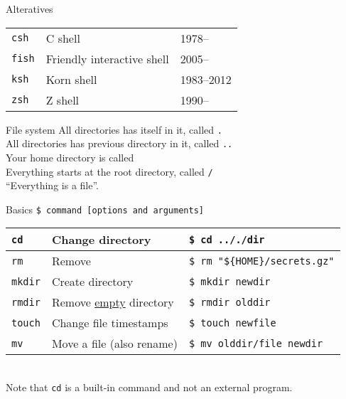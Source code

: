 \documentclass{beamer}
\let\tt\texttt
\let\ul\underline
\begin{document}
\begin{frame}{Alteratives}
        \begin{tabular}{p{} p{} p{}}
                \tt{csh}        & C shell   & 1978--  \\
                \tt{fish}       & Friendly interactive shell &  2005-- \\
                \tt{ksh}        & Korn shell & 1983--2012 \\
                \tt{zsh}        & Z shell & 1990--  \\
        \end{tabular}
\end{frame}

\begin{frame}{File system}
        All directories has itself in it, called \tt{.}                \\
        All directories has previous directory in it, called \tt{..}   \\
        Your home directory is called \tt{~}                           \\
        Everything starts at the root directory, called \tt{/}         \\
        ``Everything is a file''.
\end{frame}

\begin{frame}{Basics}
        \tt{\$ command [options and arguments]}  \\
        \begin{tabular}{p{} p{} p{}}
                \hline
                \tt{cd}           &
                Change directory  &
                \tt{\$ cd .././dir}  \\
                \hline
                \tt{rm}           &
                Remove &
                \tt{\$ rm "\$\{HOME\}/secrets.gz"}  \\
                \hline
                \tt{mkdir}           &
                Create directory &
                \tt{\$ mkdir newdir}  \\
                \hline
                \tt{rmdir}           &
                Remove \ul{empty} directory &
                \tt{\$ rmdir olddir}  \\
                \hline
                \tt{touch}               &
                Change file timestamps   &
                \tt{\$ touch newfile}       \\
                \hline
                \tt{mv}                     &
                Move a file (also rename)   &
                \tt{\$ mv olddir/file newdir}  \\
                \hline
        \end{tabular} \\
        Note that \tt{cd} is a built-in command and not an external program.
\end{frame}
\end{document}
